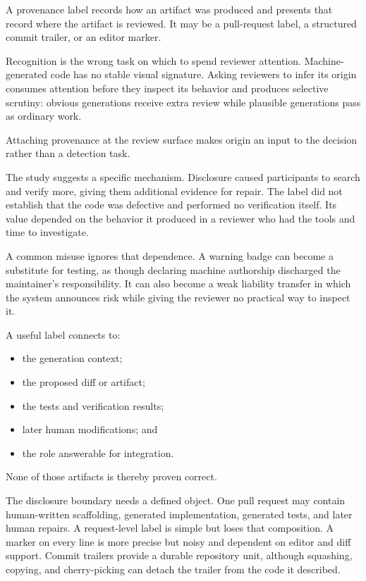 A provenance label records how an artifact was produced and presents that record where the artifact is reviewed. It may be a pull-request label, a structured commit trailer, or an editor marker.

Recognition is the wrong task on which to spend reviewer attention. Machine-generated code has no stable visual signature. Asking reviewers to infer its origin consumes attention before they inspect its behavior and produces selective scrutiny: obvious generations receive extra review while plausible generations pass as ordinary work.

Attaching provenance at the review surface makes origin an input to the decision rather than a detection task.

The study suggests a specific mechanism. Disclosure caused participants to search and verify more, giving them additional evidence for repair. The label did not establish that the code was defective and performed no verification itself. Its value depended on the behavior it produced in a reviewer who had the tools and time to investigate.

A common misuse ignores that dependence. A warning badge can become a substitute for testing, as though declaring machine authorship discharged the maintainer's responsibility. It can also become a weak liability transfer in which the system announces risk while giving the reviewer no practical way to inspect it.


A useful label connects to:

\begin{itemize}
\tightlist
\item
  the generation context;
\item
  the proposed diff or artifact;
\item
  the tests and verification results;
\item
  later human modifications; and
\item
  the role answerable for integration.
\end{itemize}

None of those artifacts is thereby proven correct.

The disclosure boundary needs a defined object. One pull request may contain human-written scaffolding, generated implementation, generated tests, and later human repairs. A request-level label is simple but loses that composition. A marker on every line is more precise but noisy and dependent on editor and diff support. Commit trailers provide a durable repository unit, although squashing, copying, and cherry-picking can detach the trailer from the code it described.

